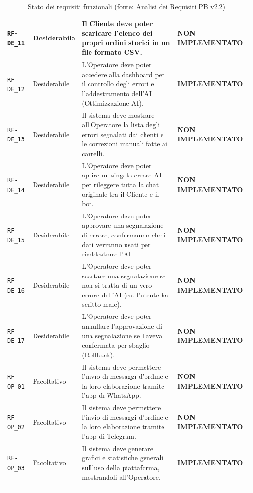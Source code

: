\documentclass[a4paper, 11pt, oneside]{scrartcl}
\begin{document}
\begin{longtable}{|>{\raggedright\arraybackslash}p{}|>{\raggedright\arraybackslash}p{}|>{\raggedright\arraybackslash}p{}|>{\raggedright\arraybackslash}p{}|}
    \texttt{RF-DE\_11} & Desiderabile & Il Cliente deve poter scaricare l'elenco dei propri ordini storici in un file formato CSV. & \textbf{NON IMPLEMENTATO} \\
    \hline
    \texttt{RF-DE\_12} & Desiderabile & L'Operatore deve poter accedere alla dashboard per il controllo degli errori e l'addestramento dell'AI (Ottimizzazione AI). & \textbf{IMPLEMENTATO} \\
    \hline
    \texttt{RF-DE\_13} & Desiderabile & Il sistema deve mostrare all'Operatore la lista degli errori segnalati dai clienti e le correzioni manuali fatte ai carrelli. & \textbf{NON IMPLEMENTATO} \\
    \hline
    \texttt{RF-DE\_14} & Desiderabile & L'Operatore deve poter aprire un singolo errore AI per rileggere tutta la chat originale tra il Cliente e il bot. & \textbf{NON IMPLEMENTATO} \\
    \hline
    \texttt{RF-DE\_15} & Desiderabile & L'Operatore deve poter approvare una segnalazione di errore, confermando che i dati verranno usati per riaddestrare l'AI. & \textbf{NON IMPLEMENTATO} \\
    \hline
    \texttt{RF-DE\_16} & Desiderabile & L'Operatore deve poter scartare una segnalazione se non si tratta di un vero errore dell'AI (es. l'utente ha scritto male). & \textbf{NON IMPLEMENTATO} \\
    \hline
    \texttt{RF-DE\_17} & Desiderabile & L'Operatore deve poter annullare l'approvazione di una segnalazione se l'aveva confermata per sbaglio (Rollback). & \textbf{NON IMPLEMENTATO} \\
    \hline
    \texttt{RF-OP\_01} & Facoltativo & Il sistema deve permettere l'invio di messaggi d'ordine e la loro elaborazione tramite l'app di WhatsApp. & \textbf{NON IMPLEMENTATO} \\
    \hline
    \texttt{RF-OP\_02} & Facoltativo & Il sistema deve permettere l'invio di messaggi d'ordine e la loro elaborazione tramite l'app di Telegram. & \textbf{NON IMPLEMENTATO} \\
    \hline
    \texttt{RF-OP\_03} & Facoltativo & Il sistema deve generare grafici e statistiche generali sull'uso della piattaforma, mostrandoli all'Operatore. & \textbf{IMPLEMENTATO} \\
    \hline
    \multicolumn{4}{c}{} \\
    \caption{Stato dei requisiti funzionali (fonte: Analisi dei Requisiti PB v2.2)}\label{tab:stato_requisiti_funzionali}
\end{longtable}
\end{document}
